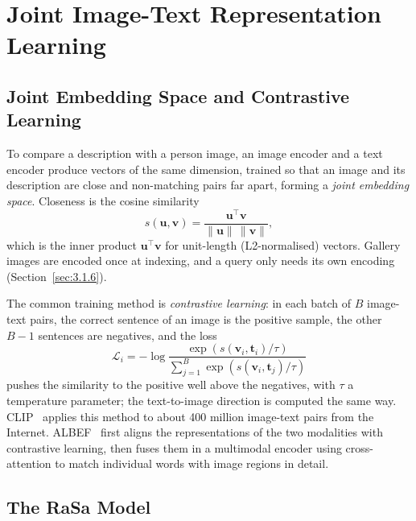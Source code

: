 \section{Joint Image-Text Representation Learning}
\label{sec:3.5}

\subsection{Joint Embedding Space and Contrastive Learning}
\label{sec:3.5.1}
\label{sec:3.5.2}

To compare a description with a person image, an image encoder and a text encoder produce vectors of the same dimension, trained so that an image and its description are close and non-matching pairs far apart, forming a \emph{joint embedding space}. Closeness is the cosine similarity
\begin{equation}
    s(\mathbf{u}, \mathbf{v}) = \frac{\mathbf{u}^\top \mathbf{v}}{\lVert \mathbf{u} \rVert \, \lVert \mathbf{v} \rVert},
    \label{eq:cosine}
\end{equation}
which is the inner product $\mathbf{u}^\top \mathbf{v}$ for unit-length (L2-normalised) vectors. Gallery images are encoded once at indexing, and a query only needs its own encoding (Section~\ref{sec:3.1.6}).

The common training method is \emph{contrastive learning}: in each batch of $B$ image-text pairs, the correct sentence of an image is the positive sample, the other $B-1$ sentences are negatives, and the loss
\begin{equation}
    \mathcal{L}_i = -\log \frac{\exp\left(s(\mathbf{v}_i, \mathbf{t}_i)/\tau\right)}{\sum_{j=1}^{B} \exp\left(s(\mathbf{v}_i, \mathbf{t}_j)/\tau\right)}
    \label{eq:contrastive}
\end{equation}
pushes the similarity to the positive well above the negatives, with $\tau$ a temperature parameter; the text-to-image direction is computed the same way. CLIP~\cite{radford2021clip} applies this method to about 400 million image-text pairs from the Internet. ALBEF~\cite{li2021albef} first aligns the representations of the two modalities with contrastive learning, then fuses them in a multimodal encoder using cross-attention to match individual words with image regions in detail.

\subsection{The RaSa Model}
\label{sec:3.5.3}

